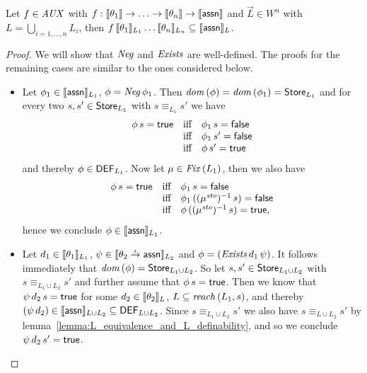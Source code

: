 \documentclass[12pt,a4paper]{report}
\newcommand{\ssto}{\nstyle{sto}}
\newcommand{\DEF}{\sstyle{DEF}}
\newcommand{\Fix}[1]{\nstyle{Fix}\,(#1)}
\newcommand{\AUX}{\nstyle{AUX}}
\newcommand{\Neg}{\nstyle{Neg}}
\newcommand{\Exists}{\nstyle{Exists}}
\begin{document}
\begin{lemma} \label{lemma:AUX_functions_are_well_defined}
  Let $f \in \AUX$ with $f: \llbracket\theta_1\rrbracket \to \ldots \to \llbracket\theta_n\rrbracket \to \llbracket\mathsf{assn}\rrbracket$
  and $\vec{L} \in W^n$ with $L = \bigcup_{i=1,\ldots,n} L_i$, then
  $f\,\llbracket\theta_1\rrbracket_{L_1}\ldots\llbracket\theta_n\rrbracket_{L_n}
    \subseteq \llbracket\mathsf{assn}\rrbracket_L$.
\end{lemma}

\begin{proof}
  We will show that $\Neg$ and $\Exists$ are well-defined. The proofs for the remaining cases are
  similar to the ones considered below.
  \begin{itemize}
    \item Let $\phi_1 \in \llbracket\mathsf{assn}\rrbracket_{L_1}$, $\phi = \Neg\,\phi_1$. Then
          $\mathit{dom}\,(\phi) = \mathit{dom}\,(\phi_1) = \mathsf{Store}_{L_1}$ and for every two $s,s'\in\mathsf{Store}_{L_1}$
          with $s \equiv_{L_1} s'$ we have
          \[\begin{array}{rcl}
            \phi\,s = \mathsf{true}
            &\text{iff}&
            \phi_1\,s = \mathsf{false} \\
            &\text{iff}&
            \phi_1\,s' = \mathsf{false} \\
            &\text{iff}&
            \phi\,s' = \mathsf{true}
          \end{array}\]
          and thereby $\phi\in\DEF_{L_1}$. Now let $\mu \in \Fix{L_1}$, then we also have
          \[\begin{array}{rcl}
            \phi\,s = \true
            &\text{iff}&
            \phi_1\,s = \false \\
            &\text{iff}&
            \phi_1\,((\mu^\ssto)^{-1}\,s) = \false \\
            &\text{iff}&
            \phi\,((\mu^\ssto)^{-1}\,s) = \true,
          \end{array}\]
          hence we conclude $\phi \in \llbracket\mathsf{assn}\rrbracket_{L_1}$.

    \item Let $d_1 \in \llbracket\theta_1\rrbracket_{L_1}$,
          $\psi \in \llbracket\theta_2\stackrel{_t}{\to}\mathsf{assn}\rrbracket_{L_2}$ and
          $\phi = (\Exists\,d_1\,\psi)$. It follows immediately that
          $\mathit{dom}\,(\phi) = \mathsf{Store}_{L_1 \cup L_2}$. So let $s,s' \in \mathsf{Store}_{L_1 \cup L_2}$ with
          $s \equiv_{L_1 \cup L_2} s'$ and further assume that $\phi\,s = \mathsf{true}$. Then we know that
          $\psi\,d_2\,s = \mathsf{true}$ for some $d_2 \in \llbracket\theta_2\rrbracket_L$,
          $L \subseteq \mathit{reach}\,(L_1,s)$, and thereby
          $(\psi\,d_2) \in \semantic{\tassn}_{L \cup L_2} \subseteq \DEF_{L \cup L_2}$.
          Since $s \equiv_{L_1\cup L_2} s'$ we also have $s \equiv_{L \cup L_2} s'$ by
          lemma~\ref{lemma:L_equivalence_and_L_definability}, and so we conclude
          $\psi\,d_2\,s' = \mathsf{true}$.


\end{itemize}
\end{proof}
\end{document}
